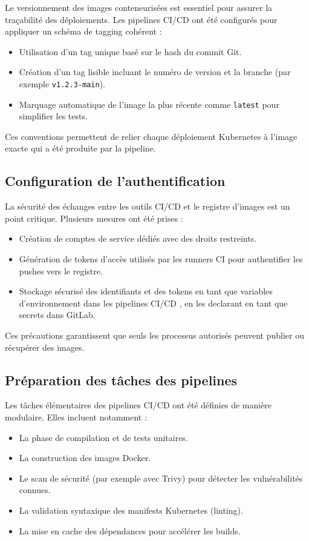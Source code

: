 Le versionnement des images conteneurisées est essentiel pour assurer la traçabilité des déploiements.
Les pipelines CI/CD ont été configurés pour appliquer un schéma de tagging cohérent :
\begin{itemize}
	\item Utilisation d’un tag unique basé sur le hash du commit Git.
	\item Création d’un tag lisible incluant le numéro de version et la branche (par exemple \texttt{v1.2.3-main}).
	\item Marquage automatique de l’image la plus récente comme \texttt{latest} pour simplifier les tests.
\end{itemize}

Ces conventions permettent de relier chaque déploiement Kubernetes à l’image exacte qui a été produite par la pipeline.

\subsection{Configuration de l’authentification}

La sécurité des échanges entre les outils CI/CD et le registre d’images est un point critique.
Plusieurs mesures ont été prises :
\begin{itemize}
	\item Création de comptes de service dédiés avec des droits restreints.
	\item Génération de tokens d’accès utilisés par les runners CI pour authentifier les pushes vers le registre.
	\item Stockage sécurisé des identifiants et des tokens en tant que variables d’environnement dans les pipelines CI/CD , en les declarant en tant que secrets dans GitLab.
\end{itemize}

Ces précautions garantissent que seuls les processus autorisés peuvent publier ou récupérer des images.

\subsection{Préparation des tâches des pipelines}

Les tâches élémentaires des pipelines CI/CD ont été définies de manière modulaire.
Elles incluent notamment :
\begin{itemize}
	\item La phase de compilation et de tests unitaires.
	\item La construction des images Docker.
	\item Le scan de sécurité (par exemple avec Trivy) pour détecter les vulnérabilités connues.
	\item La validation syntaxique des manifests Kubernetes (linting).
	\item La mise en cache des dépendances pour accélérer les builds.
\end{itemize}

